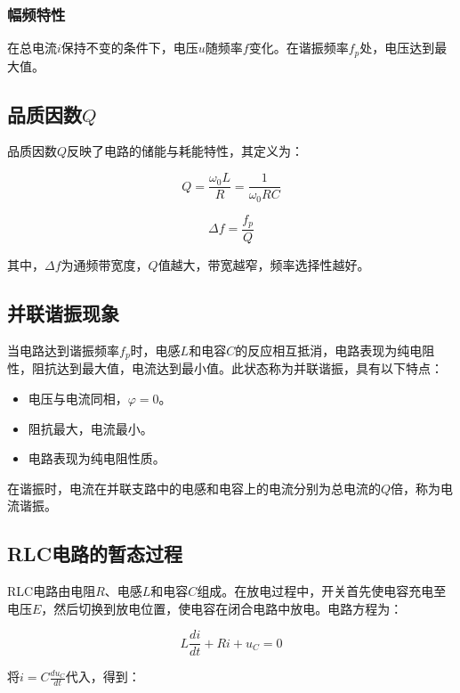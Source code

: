 \documentclass[zihao=5, UTF8]{article}
\theoremstyle{MyLineTheoremStyle} %
\theoremstyle{MyBlockTheoremStyle} %
\theoremstyle{MySubsubsectionStyle} %
\begin{document}
\subsubsection{幅频特性}

在总电流\( i \)保持不变的条件下，电压\( u \)随频率\( f \)变化。在谐振频率\( f_p \)处，电压达到最大值。

\subsection{品质因数\( Q \) }

品质因数\( Q \)反映了电路的储能与耗能特性，其定义为：

\begin{equation}
Q = \frac{\omega_0 L}{R} = \frac{1}{\omega_0 R C}
\end{equation}

\begin{equation}
\Delta f = \frac{f_p}{Q}
\end{equation}

其中，\( \Delta f \)为通频带宽度，\( Q \)值越大，带宽越窄，频率选择性越好。

\subsection{并联谐振现象}

当电路达到谐振频率\( f_p \)时，电感\( L \)和电容\( C \)的反应相互抵消，电路表现为纯电阻性，阻抗达到最大值，电流达到最小值。此状态称为并联谐振，具有以下特点：
\begin{itemize}
    \item 电压与电流同相，\( \varphi = 0 \)。
    \item 阻抗最大，电流最小。
    \item 电路表现为纯电阻性质。
\end{itemize}

在谐振时，电流在并联支路中的电感和电容上的电流分别为总电流的\( Q \)倍，称为电流谐振。

\subsection{RLC电路的暂态过程}

RLC电路由电阻\( R \)、电感\( L \)和电容\( C \)组成。在放电过程中，开关首先使电容充电至电压\( E \)，然后切换到放电位置，使电容在闭合电路中放电。电路方程为：

\[
L \frac{di}{dt} + Ri + u_C = 0
\]

将\( i = C \frac{du_C}{dt} \)代入，得到：
\end{document}
